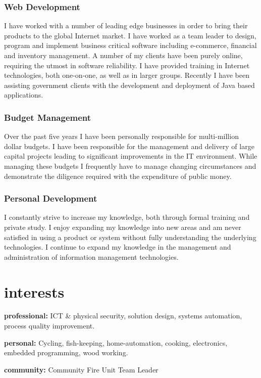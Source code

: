 \documentclass{resume} %
\begin{document}
\subsubsection*{Web Development}
I have worked with a number of leading edge businesses in order to bring their products to the global Internet market. I have worked as a team leader to design, program and implement business critical software including e-commerce, financial and inventory management. A number of my clients have been purely online, requiring the utmost in software reliability. I have provided training in Internet technologies, both one-on-one, as well as in larger groups. Recently I have been assisting government clients with the development and deployment of Java based applications.

\subsubsection*{Budget Management}
Over the past five years I have been personally responsible for multi-million dollar budgets. I have been responsible for the management and delivery of large capital projects leading to significant improvements in the IT environment. While managing these budgets I frequently have to manage changing circumstances and demonstrate the diligence required with the expenditure of public money.

\subsubsection*{Personal Development}
I constantly strive to increase my knowledge, both through formal training and private study. I enjoy expanding my knowledge into new areas and am never satisfied in using a product or system without fully understanding the underlying technologies. I continue to expand my knowledge in the management and administration of information management technologies.


\section{interests}

\textbf{professional:} ICT \& physical security, solution design, systems automation, process quality improvement.

\textbf{personal:} Cycling, fish-keeping, home-automation, cooking, electronics, embedded programming, wood working.

\textbf{community:} Community Fire Unit Team Leader

\end{document}

